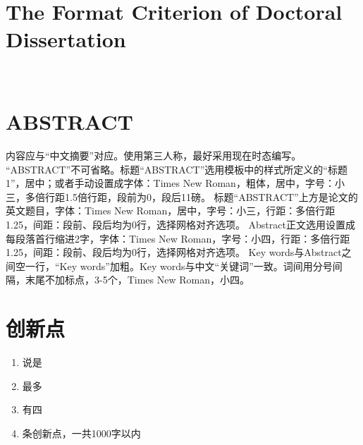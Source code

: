 {
    \chapter*{The Format Criterion of Doctoral Dissertation}%
    {
        \linespread{1.25}
        {\ }\par
    }
    \chapter{ABSTRACT}
}%

内容应与“中文摘要”对应。使用第三人称，最好采用现在时态编写。
“ABSTRACT”不可省略。标题“ABSTRACT”选用模板中的样式所定义的“标题1”，居中；或者手动设置成字体：Times New Roman，粗体，居中，字号：小三，多倍行距1.5倍行距，段前为0，段后11磅。
标题“ABSTRACT”上方是论文的英文题目，字体：Times New Roman，居中，字号：小三，行距：多倍行距 1.25，间距：段前、段后均为0行，选择网格对齐选项。
Abstract正文选用设置成每段落首行缩进2字，字体：Times New Roman，字号：小四，行距：多倍行距 1.25，间距：段前、段后均为0行，选择网格对齐选项。
Key words与Abstract之间空一行，“Key words”加粗。Key words与中文“关键词”一致。词间用分号间隔，末尾不加标点，3-5个，Times New Roman，小四。


\chapter{创\quad 新\quad 点}%


\begin{enumerate}

\item 说是

\item 最多

\item 有四

\item 条创新点，一共1000字以内

\end{enumerate}
